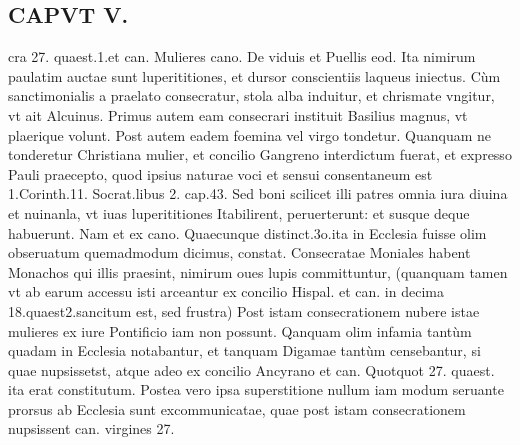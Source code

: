 \documentclass{article}
\begin{document}
\begin{pages}
\section*{CAPVT V. }
\marginpar{[ p.295 ]}\pstart cra 27. quaest.1.et can. Mulieres cano. De viduis et Puellis eod. Ita nimirum paulatim auctae sunt luperititiones, et dursor conscientiis laqueus iniectus.  \pend\pstart Cùm sanctimonialis a praelato consecratur, stola alba induitur, et chrismate vngitur, vt ait Alcuinus. Primus autem eam consecrari instituit Basilius magnus, vt plaerique volunt. Post autem eadem foemina vel virgo tondetur. Quanquam ne tonderetur Christiana mulier, et concilio Gangreno interdictum fuerat, et expresso Pauli praecepto, quod ipsius naturae voci et sensui consentaneum est 1.Corinth.11. Socrat.libus 2. cap.43. Sed boni scilicet illi patres omnia iura diuina et nuinanla, vt iuas luperititiones Itabilirent, peruerterunt: et susque deque habuerunt. Nam et ex cano. Quaecunque distinct.3o.ita in Ecclesia fuisse olim obseruatum quemadmodum dicimus, constat.  \pend\pstart Consecratae Moniales habent Monachos qui illis praesint, nimirum oues lupis committuntur, (quanquam tamen vt ab earum accessu isti arceantur ex concilio Hispal. et can. in decima 18.quaest2.sancitum est, sed frustra) Post istam consecrationem nubere istae mulieres ex iure Pontificio iam non possunt. Qanquam olim infamia tantùm quadam in Ecclesia notabantur, et tanquam Digamae tantùm censebantur, si quae nupsissetst, atque adeo ex concilio Ancyrano et can. Quotquot 27. quaest. ita erat constitutum. Postea vero ipsa superstitione nullum iam modum seruante prorsus ab Ecclesia sunt excommunicatae, quae post istam consecrationem nupsissent can. virgines 27.  \pend

\end{pages}
\end{document}
